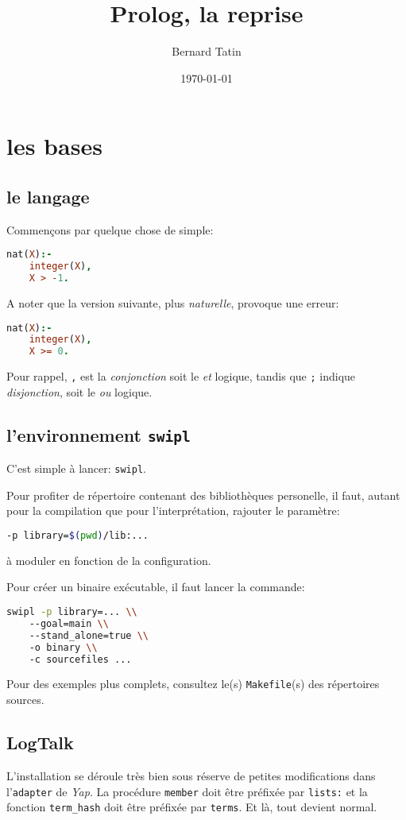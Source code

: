 \documentclass[a4paper,11pt,twocolumn]{book}
\title{Prolog, la reprise}
\author{Bernard Tatin}
\date{\today}
\begin{document}
\maketitle
\tableofcontents

\chapter{les bases}

\section{le langage}
Commençons par quelque chose de simple:

\begin{lstlisting}[language=Prolog]
nat(X):-
	integer(X),
	X > -1.
\end{lstlisting}

A noter que la version suivante, plus \emph{naturelle}, provoque une erreur:

\begin{lstlisting}[language=Prolog]
nat(X):-
	integer(X),
	X >= 0.
\end{lstlisting}

Pour rappel, \texttt{,} est la \textit{conjonction} soit le \textit{et} logique, tandis que \texttt{;} indique \textit{disjonction}, soit le \textit{ou} logique.

\section{l'environnement \texttt{swipl}}

C'est simple à lancer: \texttt{swipl}. 

Pour profiter de répertoire contenant des bibliothèques personelle, il faut, autant pour la compilation que pour l'interprétation, rajouter le paramètre:
\begin{lstlisting}[language=sh] 
-p library=$(pwd)/lib:...
\end{lstlisting}
 
à moduler en fonction de la configuration.

Pour créer un binaire exécutable, il faut lancer la commande:
\begin{lstlisting}[language=sh]
swipl -p library=... \\
    --goal=main \\
    --stand_alone=true \\
    -o binary \\
    -c sourcefiles ...
\end{lstlisting}

Pour des exemples plus complets, consultez le(s) \texttt{Makefile}(s) des répertoires sources.

\section{LogTalk}
L'installation se déroule très bien sous réserve de petites modifications dans l'\texttt{adapter} de \emph{Yap}. La procédure \texttt{member} doit être préfixée par \texttt{lists:} et la fonction \texttt{term\_hash} doit être préfixée par \texttt{terms}. Et là, tout devient normal.
\end{document}
